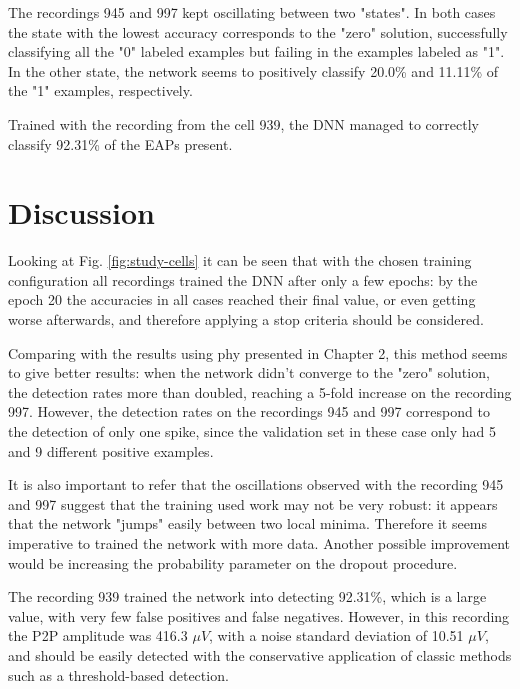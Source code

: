 The recordings 945 and 997 kept oscillating between two "states". In both cases the state with the lowest accuracy corresponds to the "zero" solution, successfully classifying all the "0" labeled examples but failing in the examples labeled as "1". In the other state, the network seems to positively classify 20.0\% and 11.11\% of the "1" examples, respectively.

Trained with the recording from the cell 939, the DNN managed to correctly classify 92.31\% of the EAPs present. 

\section{Discussion}
\label{sec:chap3-discussion}


Looking at Fig. \ref{fig:study-cells} it can be seen that with the chosen training configuration all recordings trained the DNN after only a few epochs: by the epoch 20 the accuracies in all cases reached their final value, or even getting worse afterwards, and therefore applying a stop criteria should be considered.

Comparing with the results using phy presented in Chapter 2, this method seems to give better results: when the network didn't converge to the "zero" solution, the detection rates more than doubled, reaching a 5-fold increase on the recording 997. However, the detection rates on the recordings 945 and 997 correspond to the detection of only one spike, since the validation set in these case only had 5 and 9 different positive examples. 

It is also important to refer that the oscillations observed with the recording 945 and 997 suggest that the training used work may not be very robust: it appears that the network "jumps" easily between two local minima. Therefore it seems imperative to trained the network with more data. Another possible improvement would be increasing the probability parameter on the dropout procedure.

The recording 939 trained the network into detecting 92.31\%, which is a large value, with very few false positives and false negatives. However, in this recording the P2P amplitude was 416.3 $\mu V$, with a noise standard deviation of 10.51 $\mu V$, and should be easily detected with the conservative application of classic methods such as a threshold-based detection.

